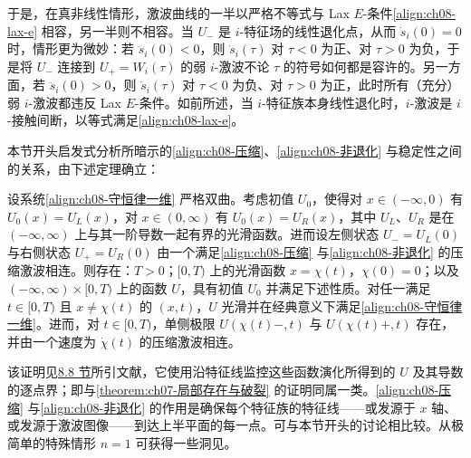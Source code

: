 \documentclass[../../main.tex]{subfiles}
\begin{document}
于是，在真非线性情形，激波曲线的一半以严格不等式与 Lax $E$-条件\eqref{align:ch08-lax-e} 相容，另一半则不相容。当 $U_-$ 是 $i$-特征场的线性退化点，从而 $\dot s_i(0)=0$ 时，情形更为微妙：若 $\ddot s_i(0)<0$，则 $\dot s_i(\tau)$ 对 $\tau<0$ 为正、对 $\tau>0$ 为负，于是将 $U_-$ 连接到 $U_+=W_i(\tau)$ 的弱 $i$-激波不论 $\tau$ 的符号如何都是容许的。另一方面，若 $\ddot s_i(0)>0$，则 $\dot s_i(\tau)$ 对 $\tau<0$ 为负、对 $\tau>0$ 为正，此时所有（充分）弱 $i$-激波都违反 Lax $E$-条件。如前所述，当 $i$-特征族本身线性退化时，$i$-激波是 $i$-接触间断，以等式满足\eqref{align:ch08-lax-e}。

本节开头启发式分析所暗示的\eqref{align:ch08-压缩}、\eqref{align:ch08-非退化} 与稳定性之间的关系，由下述定理确立：

\begin{theorem}[压缩激波的局部存在性]\label{theorem:ch08-压缩激波存在性}
设系统\eqref{align:ch08-守恒律一维} 严格双曲。考虑初值 $U_0$，使得对 $x\in(-\infty,0)$ 有 $U_0(x)=U_L(x)$，对 $x\in(0,\infty)$ 有 $U_0(x)=U_R(x)$，其中 $U_L$、$U_R$ 是在 $(-\infty,\infty)$ 上与其一阶导数一起有界的光滑函数。进而设左侧状态 $U_-=U_L(0)$ 与右侧状态 $U_+=U_R(0)$ 由一个满足\eqref{align:ch08-压缩} 与\eqref{align:ch08-非退化} 的压缩激波相连。则存在：$T>0$；$[0,T)$ 上的光滑函数 $x=\chi(t)$，$\chi(0)=0$；以及 $(-\infty,\infty)\times[0,T)$ 上的函数 $U$，具有初值 $U_0$ 并满足下述性质。对任一满足 $t\in[0,T)$ 且 $x\neq\chi(t)$ 的 $(x,t)$，$U$ 光滑并在经典意义下满足\eqref{align:ch08-守恒律一维}。进而，对 $t\in[0,T)$，单侧极限 $U(\chi(t)-,t)$ 与 $U(\chi(t)+,t)$ 存在，并由一个速度为 $\dot\chi(t)$ 的压缩激波相连。
\end{theorem}

该证明见\hyperref[section:ch08-注记]{8.8 节}所引文献，它使用沿特征线监控这些函数演化所得到的 $U$ 及其导数的逐点界；即与\cref{theorem:ch07-局部存在与破裂} 的证明同属一类。\eqref{align:ch08-压缩} 与\eqref{align:ch08-非退化} 的作用是确保每个特征族的特征线——或发源于 $x$ 轴、或发源于激波图像——到达上半平面的每一点。可与本节开头的讨论相比较。从极简单的特殊情形 $n=1$ 可获得一些洞见。
\end{document}
